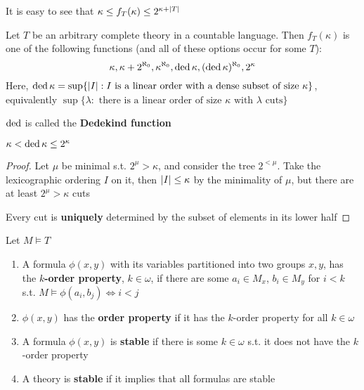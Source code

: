 \documentclass[11pt]{article}
\begin{document}
It is easy to see that \(\kappa\le f_T(\kappa)\le 2^{\kappa+\abs{T}}\)

\begin{fact}
Let \(T\) be an arbitrary complete theory in a countable language. Then \(f_T(\kappa)\) is one of the
following functions (and all of these options occur for some \(T\)):
\begin{equation*}
\kappa,\kappa+2^{\aleph_0},\kappa^{\aleph_0},\operatorname{ded}\kappa,(\operatorname{ded}\kappa)^{\aleph_0},2^\kappa
\end{equation*}
Here, \(\ded\kappa=\sup\{\abs{I}:I\text{ is a linear order with a dense subset of size }\kappa\}\),
equivalently \(\sup\{\lambda:\text{ there is a linear order of size $\kappa$ with $\lambda$ cuts}\}\)
\end{fact}

\(\operatorname{ded}\) is called the \textbf{Dedekind function}

\begin{lemma}[]
\(\kappa<\operatorname{ded}\kappa\le 2^\kappa\)
\end{lemma}

\begin{proof}
Let \(\mu\) be minimal s.t. \(2^\mu>\kappa\), and consider the tree \(2^{<\mu}\). Take the lexicographic
ordering \(I\) on it, then \(\abs{I}\le\kappa\) by the minimality of \(\mu\), but there are at
least \(2^\mu>\kappa\) cuts

Every cut is \textbf{uniquely} determined by the subset of elements in its lower half
\end{proof}

\begin{definition}[]
Let \(M\vDash T\)
\begin{enumerate}
\item A formula \(\phi(x,y)\) with its variables partitioned into two groups \(x,y\), has the
\textbf{\(k\)-order property}, \(k\in\omega\), if there are some \(a_i\in M_x\), \(b_i\in M_y\) for \(i<k\)
s.t. \(M\vDash\phi(a_i,b_j)\Leftrightarrow i<j\)
\item \(\phi(x,y)\) has the \textbf{order property} if it has the \(k\)-order property for all \(k\in\omega\)
\item A formula \(\phi(x,y)\) is \textbf{stable} if there is some \(k\in\omega\) s.t. it does not have the \(k\)-order property
\item A theory is \textbf{stable} if it implies that all formulas are stable
\end{enumerate}
\end{definition}
\end{document}
